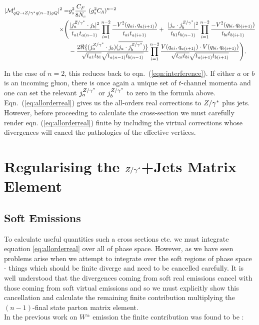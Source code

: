 		\begin{align}
		\begin{split}
		    |\mathcal{M}^{t}_{qQ\to Z/\gamma^* q(n-2)gQ}|^2 = &g_s^2 \frac{C_F}{8N_c}\ ( g_s^2
		    C_{\!A})^{n-2}\  \\  \times \Bigg(& \frac{| j_a^{Z/\gamma^*}\cdot j_b|^2}{t_{a1}t_{a(n-1)}} \prod^{n-2}_{i=1} \frac{-V^2(q_{ai},
		      q_{a(i+1)})}{t_{ai} t_{a(i+1)}}+\ \frac{|j_a \cdot j_b^{Z/\gamma^*} |^2}{t_{b1}t_{b(n-1)}}
		    \prod^{n-2}_{i=1}\frac{-V^2(q_{bi}, q_{b(i+1)})}{t_{bi} t_{b(i+1)}}  \\
		    &- \frac{2\Re\{(j_a^{Z/\gamma^*}\cdot j_b)(\overline{j_a \cdot
		        j_b^{Z/\gamma^*}})\}}{\sqrt{t_{a1}t_{b1}}\sqrt{t_{a(n-1)} t_{b(n-1)}}}
		    \prod^{n-2}_{i=1}\frac{V(q_{ai}, q_{a(i+1)})\cdot V(q_{bi},
		      q_{b(i+1)})}{\sqrt{t_{ai}t_{bi}} \sqrt{t_{a(i+1)}t_{b(i+1)}}}\Bigg).
			\label{eq:allorderreal}
		\end{split}
		\end{align}

		In the case of $n=2$, this reduces back to eqn.~(\ref{eqn:interference}).  If
		either $a$ or $b$ is an incoming gluon, there is once again a unique set of
		$t$-channel momenta and one can set the relevant $j_a^{Z/\gamma^*}$ or $j_b^{Z/\gamma^*}$ to
		zero in the formula above.\\Eqn.~(\ref{eq:allorderreal}) gives us the all-orders
		real corrections to $Z/\gamma^*$ plus jets.  However, before proceeding to calculate the
		cross-section we must carefully render eqn. (\ref{eq:allorderreal}) finite by
		including the virtual corrections whose divergences will cancel the pathologies
		of the effective vertices.

\section{Regularising the $Z/\gamma^*$+Jets Matrix Element}
	\label{sec:regularising}

	\subsection{Soft Emissions}
		\label{sub:softEmissions}

		To calculate useful quantities such a cross sections etc. we must integrate equation
		\eqref{eq:allorderreal} over all of phase space.  However, as we have seen problems arise
		when we attempt to integrate over the soft regions of phase space
		- things which should be finite diverge and need to be cancelled carefully.  It is well understood
		that the divergences coming from soft real emissions cancel with those coming from soft
		virtual emissions and so we must explicitly show this cancellation and calculate the remaining
		finite contribution multiplying the $(n-1)$-final state parton matrix element.\\
		In the previous work on $W^\pm$ emission the finite contribution was found to be
		\cite{Andersen:2009nu, Andersen:2008gc}:

